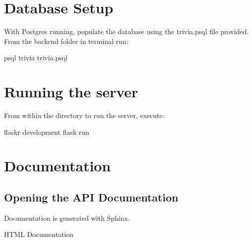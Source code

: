 \documentclass[letterpaper,10pt,english]{sphinxmanual}
\begin{document}
\section{Database Setup}
\label{\detokenize{index:database-setup}}
With Postgres running, populate the database using the trivia.psql file provided. From the backend folder in terminal run:

\begin{sphinxVerbatim}[commandchars=\\\{\}]
psql trivia \PYGZlt{} trivia.psql
\end{sphinxVerbatim}


\section{Running the server}
\label{\detokenize{index:running-the-server}}
From within the  directory to run the server, execute:

\begin{sphinxVerbatim}[commandchars=\\\{\}]
 flaskr
 development
flask run
\end{sphinxVerbatim}


\section{Documentation}
\label{\detokenize{index:documentation}}

\subsection{Opening the API Documentation}
\label{\detokenize{index:opening-the-api-documentation}}
Documentation is generated with Sphinx.

HTML Documentation
\end{document}

